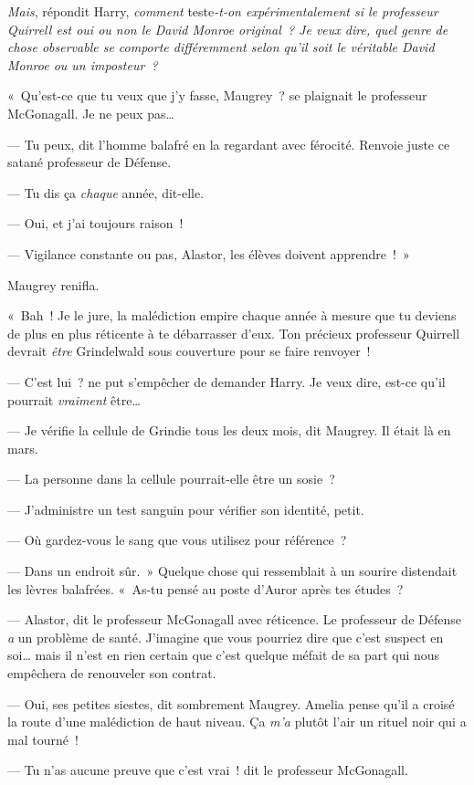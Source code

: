 \emph{Mais}, répondit Harry, \emph{comment} teste\emph{-t-on expérimentalement si le professeur Quirrell est oui ou non le David Monroe original~?
Je veux dire, quel genre de chose observable se comporte différemment selon qu'il soit le véritable David Monroe ou un imposteur~?}

«~Qu'est-ce que tu veux que j'y fasse, Maugrey~? se plaignait le professeur McGonagall.
Je ne peux pas…

--- Tu peux, dit l'homme balafré en la regardant avec férocité.
Renvoie juste ce satané professeur de Défense.

--- Tu dis ça \emph{chaque} année, dit-elle.

--- Oui, et j'ai toujours raison~!

--- Vigilance constante ou pas, Alastor, les élèves doivent apprendre~!~»

Maugrey renifla.

«~Bah~! Je le jure, la malédiction empire chaque année à mesure que tu deviens de plus en plus réticente à te débarrasser d'eux.
Ton précieux professeur Quirrell devrait \emph{être} Grindelwald sous couverture pour se faire renvoyer~!

--- C'est lui~? ne put s'empêcher de demander Harry.
Je veux dire, est-ce qu'il pourrait \emph{vraiment} être…

--- Je vérifie la cellule de Grindie tous les deux mois, dit Maugrey.
Il était là en mars.

--- La personne dans la cellule pourrait-elle être un sosie~?

--- J'administre un test sanguin pour vérifier son identité, petit.

--- Où gardez-vous le sang que vous utilisez pour référence~?

--- Dans un endroit sûr.~»
Quelque chose qui ressemblait à un sourire distendait les lèvres balafrées.
«~As-tu pensé au poste d'Auror après tes études~?

--- Alastor, dit le professeur McGonagall avec réticence.
Le professeur de Défense \emph{a} un problème de santé.
J'imagine que vous pourriez dire que c'est suspect en soi… mais il n'est en rien certain que c'est quelque méfait de sa part qui nous empêchera de renouveler son contrat.

--- Oui, ses petites siestes, dit sombrement Maugrey.
Amelia pense qu'il a croisé la route d'une malédiction de haut niveau.
Ça \emph{m'a} plutôt l'air un rituel noir qui a mal tourné~!

--- Tu n'as aucune preuve que c'est vrai~! dit le professeur McGonagall.

